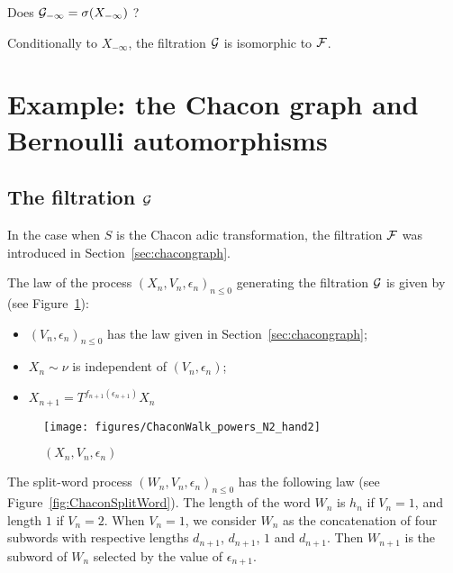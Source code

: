 \documentclass[12pt,a4paper]{article}
\begin{document}
\begin{question}
Does $\mathcal{G}_{-\infty} = \sigma(X_{-\infty})$ ? 
\end{question}

\begin{clarify}
Conditionally to $X_{-\infty}$, the filtration $\mathcal{G}$ is isomorphic to $\mathcal{F}$.  
\end{clarify}


\section{Example: the Chacon graph and Bernoulli automorphisms}

\subsection{The filtration $\mathcal{G}$}

In the case when $S$ is the Chacon adic transformation, the 
filtration $\mathcal{F}$ was introduced in Section~\ref{sec:chacongraph}. 

The law of the process ${(X_n, V_n, \epsilon_n)}_{n \leq 0}$ generating the 
filtration $\mathcal{G}$ is given by (see Figure~\ref{fig:ChaconPowers}):

\begin{itemize}
\item ${(V_n, \epsilon_n)}_{n \leq 0}$ has the law given in Section~\ref{sec:chacongraph};

\item $X_n \sim \nu$ is independent of $(V_n, \epsilon_n)$;

\item $X_{n+1} = T^{f_{n+1}(\epsilon_{n+1})}X_n$
\end{itemize}

\begin{figure}[!h]
\centering
	\texttt{[image: figures/ChaconWalk\_powers\_N2\_hand2]}
\caption{$(X_n, V_n, \epsilon_n)$}
\label{fig:ChaconPowers}
\end{figure}

The split-word process ${(W_n, V_n, \epsilon_n)}_{n \leq 0}$ 
has the following law (see Figure~\ref{fig:ChaconSplitWord}). 
The length of the word $W_n$ is $h_n$ if $V_n=1$, and length $1$ if $V_n=2$. 
When $V_n=1$, we consider $W_n$ as the concatenation of four subwords 
with respective lengths $d_{n+1}$, $d_{n+1}$, $1$ and $d_{n+1}$. 
Then $W_{n+1}$ is the subword of $W_n$ selected by the value of $\epsilon_{n+1}$. 
\end{document}
